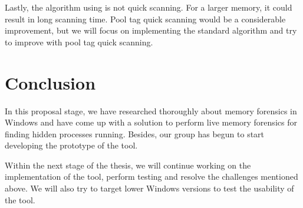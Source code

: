Lastly, the algorithm using is not quick scanning. For a larger memory, it could result in long scanning time. Pool tag quick scanning would be a considerable improvement, but we will focus on implementing the standard algorithm and try to improve with pool tag quick scanning.

\section[Conclusion]{Conclusion}

In this proposal stage, we have researched thoroughly about memory forensics in Windows and have come up with a solution to perform live memory forensics for finding hidden processes running. Besides, our group has begun to start developing the prototype of the tool.

Within the next stage of the thesis, we will continue working on the implementation of the tool, perform testing and resolve the challenges mentioned above. We will also try to target lower Windows versions to test the usability of the tool.

